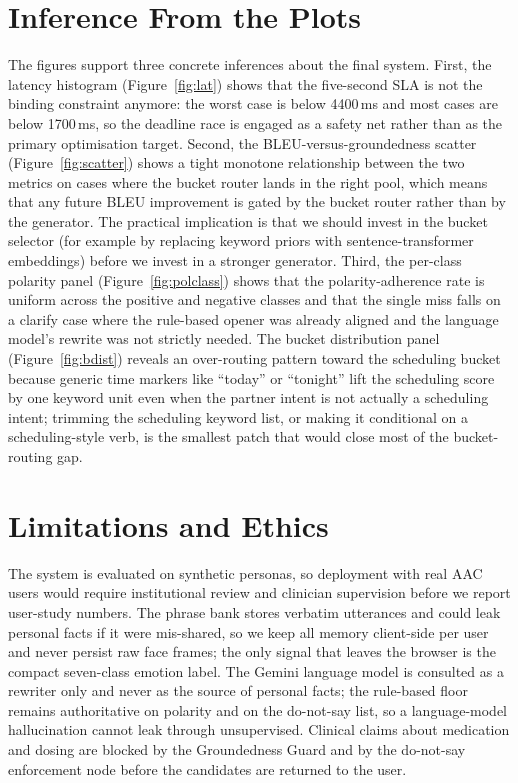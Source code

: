 \documentclass[10pt,letterpaper]{article}
\begin{document}
\section{Inference From the Plots}
The figures support three concrete inferences about the final system.
First, the latency histogram (Figure~\ref{fig:lat}) shows that the
five-second SLA is not the binding constraint anymore: the worst
case is below 4400\,ms and most cases are below 1700\,ms, so the
deadline race is engaged as a safety net rather than as the primary
optimisation target. Second, the BLEU-versus-groundedness scatter
(Figure~\ref{fig:scatter}) shows a tight monotone relationship
between the two metrics on cases where the bucket router lands in
the right pool, which means that any future BLEU improvement is
gated by the bucket router rather than by the generator. The
practical implication is that we should invest in the bucket
selector (for example by replacing keyword priors with
sentence-transformer embeddings) before we invest in a stronger
generator. Third, the per-class polarity panel
(Figure~\ref{fig:polclass}) shows that the polarity-adherence rate
is uniform across the positive and negative classes and that the
single miss falls on a clarify case where the rule-based opener was
already aligned and the language model's rewrite was not strictly
needed. The bucket distribution panel (Figure~\ref{fig:bdist})
reveals an over-routing pattern toward the scheduling bucket because
generic time markers like ``today'' or ``tonight'' lift the
scheduling score by one keyword unit even when the partner intent is
not actually a scheduling intent; trimming the scheduling keyword
list, or making it conditional on a scheduling-style verb, is the
smallest patch that would close most of the bucket-routing gap.

\section{Limitations and Ethics}
The system is evaluated on synthetic personas, so deployment with
real AAC users would require institutional review and clinician
supervision before we report user-study numbers. The phrase bank
stores verbatim utterances and could leak personal facts if it were
mis-shared, so we keep all memory client-side per user and never
persist raw face frames; the only signal that leaves the browser is
the compact seven-class emotion label. The Gemini language model is
consulted as a rewriter only and never as the source of personal
facts; the rule-based floor remains authoritative on polarity and on
the do-not-say list, so a language-model hallucination cannot leak
through unsupervised. Clinical claims about medication and dosing are
blocked by the Groundedness Guard and by the do-not-say enforcement
node before the candidates are returned to the user.
\end{document}
